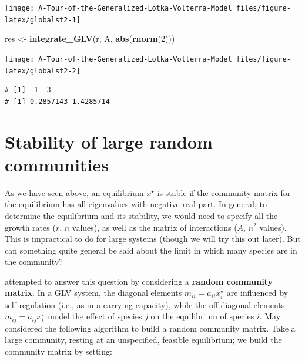 \documentclass[]{book}
\newenvironment{Shaded}{\begin{snugshade}}{\end{snugshade}}
\newcommand{\DecValTok}[1]{\textcolor[rgb]{0.00,0.00,0.81}{#1}}
\newcommand{\KeywordTok}[1]{\textcolor[rgb]{0.13,0.29,0.53}{\textbf{#1}}}
\newcommand{\NormalTok}[1]{#1}
\newcommand{\StringTok}[1]{\textcolor[rgb]{0.31,0.60,0.02}{#1}}
\begin{document}
\begin{center}\texttt{[image: A-Tour-of-the-Generalized-Lotka-Volterra-Model\_files/figure-latex/globalst2-1]} \end{center}

\begin{Shaded}
\begin{Highlighting}[]
\NormalTok{res <-}\StringTok{ }\KeywordTok{integrate_GLV}\NormalTok{(r, A, }\KeywordTok{abs}\NormalTok{(}\KeywordTok{rnorm}\NormalTok{(}\DecValTok{2}\NormalTok{)))}
\end{Highlighting}
\end{Shaded}

\begin{center}\texttt{[image: A-Tour-of-the-Generalized-Lotka-Volterra-Model\_files/figure-latex/globalst2-2]} \end{center}

\begin{verbatim}
# [1] -1 -3
# [1] 0.2857143 1.4285714
\end{verbatim}

\hypertarget{stability-of-large-random-communities}{%
\section{Stability of large random communities}\label{stability-of-large-random-communities}}

As we have seen above, an equilibrium \(x^\star\) is stable if the community matrix for the equilibrium has all eigenvalues with negative real part. In general, to determine the equilibrium and its stability, we would need to specify all the growth rates (\(r\), \(n\) values), as well as the matrix of interactions (\(A\), \(n^2\) values). This is impractical to do for large systems (though we will try this out later). But can something quite general be said about the limit in which many species are in the community?

\citet{may1972will} attempted to answer this question by considering a \textbf{random community matrix}. In a GLV system, the diagonal elements \(m_{ii} = a_{ii} x_i^\star\) are influenced by self-regulation (i.e., as in a carrying capacity), while the off-diagonal elements \(m_{ij} = a_{ij} x_i^\star\) model the effect of species \(j\) on the equilibrium of species \(i\). May considered the following algorithm to build a random community matrix. Take a large community, resting at an unspecified, feasible equilibrium; we build the community matrix by setting:
\end{document}
